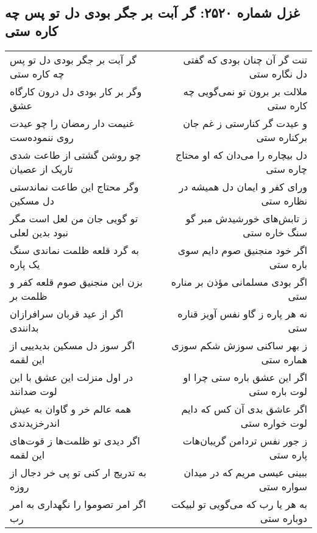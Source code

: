 \begin{center}
\section*{غزل شماره ۲۵۲۰: گر آبت بر جگر بودی دل تو پس چه کاره ستی}
\label{sec:2520}
\begin{longtable}{l p{0.5cm} r}
گر آبت بر جگر بودی دل تو پس چه کاره ستی
&&
تنت گر آن چنان بودی که گفتی دل نگاره ستی
\\
وگر بر کار بودی دل درون کارگاه عشق
&&
ملالت بر برون تو نمی‌گویی چه کاره ستی
\\
غنیمت دار رمضان را چو عیدت روی ننموده‌ست
&&
و عیدت گر کنارستی ز غم جان برکناره ستی
\\
چو روشن گشتی از طاعت شدی تاریک از عصیان
&&
دل بیچاره را می‌دان که او محتاج چاره ستی
\\
وگر محتاج این طاعت نماندستی دل مسکین
&&
ورای کفر و ایمان دل همیشه در نظاره ستی
\\
تو گویی جان من لعل است مگر نبود بدین لعلی
&&
ز تابش‌های خورشیدش مبر گو سنگ خاره ستی
\\
به گرد قلعه ظلمت نماندی سنگ یک پاره
&&
اگر خود منجنیق صوم دایم سوی باره ستی
\\
بزن این منجنیق صوم قلعه کفر و ظلمت بر
&&
اگر بودی مسلمانی مؤذن بر مناره ستی
\\
اگر از عید قربان سرافرازان بدانندی
&&
نه هر پاره ز گاو نفس آویز قناره ستی
\\
اگر سوز دل مسکین بدیدییی از این لقمه
&&
ز بهر ساکنی سوزش شکم سوزی هماره ستی
\\
در اول منزلت این عشق با این لوت ضدانند
&&
اگر این عشق باره ستی چرا او لوت باره ستی
\\
همه عالم خر و گاوان به عیش اندرخزیدندی
&&
اگر عاشق بدی آن کس که دایم لوت خواره ستی
\\
اگر دیدی تو ظلمت‌ها ز قوت‌های این لقمه
&&
ز جور نفس تردامن گریبان‌هات پاره ستی
\\
به تدریج ار کنی تو پی خر دجال از روزه
&&
ببینی عیسی مریم که در میدان سواره ستی
\\
اگر امر تصوموا را نگهداری به امر رب
&&
به هر یا رب که می‌گویی تو لبیکت دوباره ستی
\\
\end{longtable}
\end{center}
